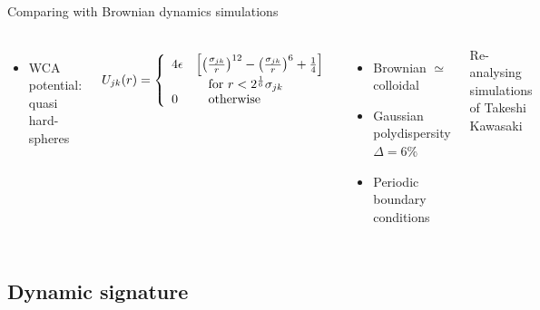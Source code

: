 \begin{frame}{Comparing with Brownian dynamics simulations}
	\begin{columns}
		\resizebox{\columnwidth}{!}{\begin{Large}\end{Large}}
	\begin{itemize}
		\item WCA potential: quasi hard-spheres
	\end{itemize}
	\[ U_{jk}(r) = \left\{\begin{array}{l l}
  		4\epsilon & \left[ \left( \frac{\sigma_{jk}}{r}\right)^{12} - \left( \frac{\sigma_{jk}}{r}\right)^{6} +\frac{1}{4}\right]  \\
  		& \quad \text{for }r<2^\frac{1}{6} \sigma_{jk}\\
  		0 & \quad \text{otherwise}
  	\end{array} \right. \]
  	\begin{itemize}
		\item Brownian $\simeq$ colloidal
		\item Gaussian polydispersity $\Delta=6\%$
		\item Periodic boundary conditions
	\end{itemize}
	
	\bigskip
	\footnotesize{Re-analysing simulations of Takeshi Kawasaki}
	\end{columns}
\end{frame}

\subsection{Dynamic signature}

